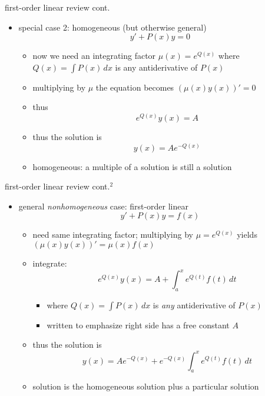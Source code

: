 \documentclass{beamer}
\begin{document}
\begin{frame}{first-order linear review cont.}

\begin{itemize}
\item special case 2: homogeneous (but otherwise general)
    $$y' + P(x) y = 0$$

    \begin{itemize}
    \item now we need an integrating factor $\mu(x) = e^{Q(x)}$ where $Q(x) = \int P(x)\,dx$ is any antiderivative of $P(x)$
    \item multiplying by $\mu$ the equation becomes $\left(\mu(x) y(x)\right)' = 0$
    \item thus
        $$e^{Q(x)} y(x) = A$$
    \item thus the solution is
        $$y(x) = A e^{-Q(x)}$$
    \item homogeneous: \alert{a multiple of a solution is still a solution}
    \end{itemize}
\end{itemize}
\end{frame}


\begin{frame}{first-order linear review cont.$^2$}

\begin{itemize}
\item general \emph{nonhomogeneous} case: first-order linear
    $$y' + P(x) y = f(x)$$

    \begin{itemize}
    \item need same integrating factor; multiplying by $\mu=e^{Q(x)}$ yields $\left(\mu(x) y(x)\right)' = \mu(x) f(x)$
    \item integrate:
        $$e^{Q(x)} y(x) = A + \int_a^x e^{Q(t)} f(t)\,dt$$

        \begin{itemize}
        \item where $Q(x)=\int P(x)\,dx$ is \emph{any} antiderivative of $P(x)$
        \item written to emphasize right side has a free constant $A$
        \end{itemize}
    \item thus the solution is
        $$y(x) = A e^{-Q(x)} +  e^{-Q(x)} \int_a^x e^{Q(t)} f(t)\,dt$$
    \item \alert{solution is the homogeneous solution plus a particular solution}
    \end{itemize}
\end{itemize}
\end{frame}
\end{document}
